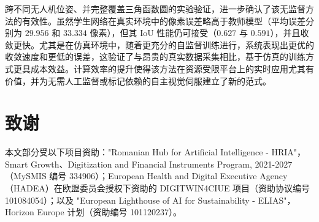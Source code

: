 \documentclass[10pt,twocolumn,letterpaper]{article}
\begin{document}
跨不同无人机位姿、并完整覆盖三角函数圆的实验验证，进一步确认了该无监督方法的有效性。虽然学生网络在真实环境中的像素误差略高于教师模型（平均误差分别为 $29.956$ 和 $33.334$ 像素），但其 IoU 性能仍可接受（$0.627$ 与 $0.591$），并且收敛更快。尤其是在仿真环境中，随着更充分的自监督训练进行，系统表现出更优的收敛速度和更低的误差，这验证了与昂贵的真实数据采集相比，基于仿真的训练方式更具成本效益。计算效率的提升使得该方法在资源受限平台上的实时应用尤其有价值，并为无需人工监督或标记依赖的自主视觉伺服建立了新的范式。

\section*{致谢}
本文部分受以下项目资助："Romanian Hub for Artificial Intelligence - HRIA"，Smart Growth、Digitization and Financial Instruments Program, 2021-2027（MySMIS 编号 334906）；European Health and Digital Executive Agency（HADEA）在欧盟委员会授权下资助的 DIGITWIN4CIUE 项目（资助协议编号 101084054）；以及 "European Lighthouse of AI for Sustainability - ELIAS"，Horizon Europe 计划（资助编号 101120237）。
{
\small


}
\end{document}

